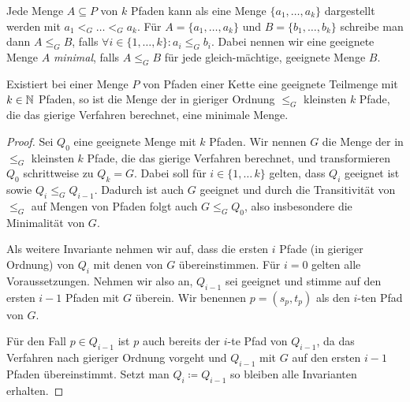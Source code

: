 Jede Menge $A \subseteq P$ von $k$ Pfaden kann als eine Menge $\{a_1, \dots, a_k\}$ dargestellt werden mit
$a_1 <_G \dots <_G a_k$.
Für $A=\{a_1,\dots,a_k\}$ und $B=\{b_1,\dots,b_k\}$ schreibe man dann $A \leq_G B$, falls $\forall i \in \{1,\dots,k\}\colon a_i \leq_G b_i$.
Dabei nennen wir eine geeignete Menge $A$ {\em minimal}, falls $A \leq_G B$ für jede gleich-mächtige, geeignete Menge $B$.
\begin{lemma}\label{lem:optimalityGreedyAlgorithm}
    Existiert bei einer Menge $P$ von Pfaden einer Kette eine geeignete Teilmenge mit $k \in \mathbb N$ Pfaden, so ist die
    Menge der in gieriger Ordnung $\leq_G$ kleinsten $k$ Pfade, die das gierige Verfahren berechnet, eine minimale Menge.
\end{lemma}
\begin{proof}
    Sei $Q_0$ eine geeignete Menge mit $k$ Pfaden.
    Wir nennen $G$ die Menge der in $\leq_G$ kleinsten $k$ Pfade, die das gierige Verfahren berechnet, und
    transformieren $Q_0$ schrittweise zu $Q_k = G$.
    Dabei soll für $i \in \{1,\dots\,k\}$ gelten, dass $Q_i$ geeignet ist sowie $Q_i \leq_G Q_{i-1}$.
    Dadurch ist auch $G$ geeignet und durch die Transitivität von $\leq_G$ auf Mengen von Pfaden folgt auch $G \leq_G Q_0$,
    also insbesondere die Minimalität von $G$.

    Als weitere Invariante nehmen wir auf, dass die ersten $i$ Pfade (in gieriger Ordnung) von $Q_i$ mit denen von $G$
    übereinstimmen.
    Für $i=0$ gelten alle Voraussetzungen.
    Nehmen wir also an, $Q_{i-1}$ sei geeignet und stimme auf den ersten $i-1$ Pfaden mit $G$ überein.
    Wir benennen $p=(s_p, t_p)$ als den $i$-ten Pfad von $G$.

    Für den Fall $p \in Q_{i-1}$ ist $p$ auch bereits der $i$-te Pfad von $Q_{i-1}$, da das Verfahren nach
    gieriger Ordnung vorgeht und $Q_{i-1}$ mit $G$ auf den ersten $i-1$ Pfaden übereinstimmt.
    Setzt man $Q_i \coloneqq Q_{i-1}$ so bleiben alle Invarianten erhalten.


\end{proof}
